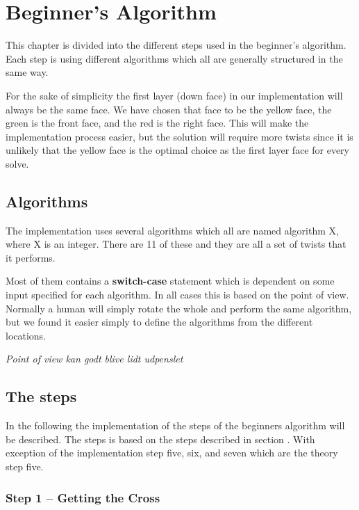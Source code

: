 \chapter{Beginner's Algorithm}\label{chap:beginnerImplement}
This chapter is divided into the different steps used in the beginner's algorithm.
Each step is using different algorithms which all are generally structured in the same way. 

For the sake of simplicity the first layer (down face) in our implementation will always be the same face. We have chosen that face to be the yellow face, the green is the front face, and the red is the right face. This will make the implementation process easier, but the solution will require more twists since it is unlikely that the yellow face is the optimal choice as the first layer face for every solve.

\section{Algorithms}
The implementation uses several algorithms which all are named algorithm X, where X is an integer. There are 11 of these and they are all a set of twists that it performs.

Most of them contains a \textbf{switch-case} statement which is dependent on some input specified for each algorithm. In all cases this is based on the point of view. Normally a human will simply rotate the whole \cube{} and perform the same algorithm, but we found it easier simply to define the algorithms from the different locations.

\emph{Point of view kan godt blive lidt udpenslet}
\section{The steps}
In the following the implementation of the steps of the beginners algorithm will be described.
The steps is based on the steps described in section \label{sec:beginner}. With exception of the implementation step five, six, and seven which are the theory step five. 
\subsection{Step 1 -- Getting the Cross}

